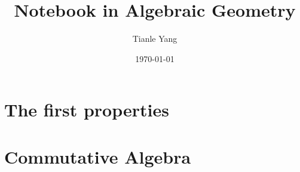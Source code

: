 \documentclass{notetobook}
\title{Notebook in Algebraic Geometry}
\author{Tianle Yang}
\date{\today}
\begin{document}
    \pagestyle{empty}
    \maketitle

    \frontmatter

    \pagestyle{mainmatterstyle}

    \tableofcontents

    \mainmatter

    \chapter{The first properties}
         
        

    \appendix

    \chapter{Commutative Algebra}
        
        
        
        
        

    \printbibliography
    
\end{document}
